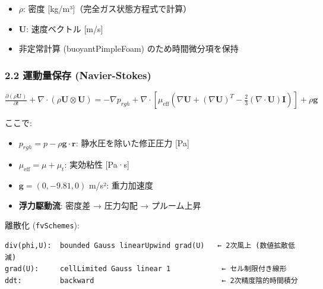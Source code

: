 \documentclass[a4paper,11pt]{article}
\begin{document}
\begin{itemize} \item $\rho$: 密度 [kg/m³]（完全ガス状態方程式で計算） \end{itemize}
\begin{itemize} \item $\mathbf{U}$: 速度ベクトル [m/s] \end{itemize}
\begin{itemize} \item 非定常計算 (buoyantPimpleFoam) のため時間微分項を保持 \end{itemize}

\subsubsection{2.2 運動量保存 (Navier-Stokes)}

$
\frac{\partial (\rho \mathbf{U})}{\partial t}
+ \nabla \cdot (\rho \mathbf{U} \otimes \mathbf{U})
= -\nabla p_{rgh}
+ \nabla \cdot \left[ \mu_{\text{eff}} \left( \nabla \mathbf{U} + (\nabla \mathbf{U})^T - \frac{2}{3} (\nabla \cdot \mathbf{U}) \mathbf{I} \right) \right]
+ \rho \mathbf{g}
$

ここで:

\begin{itemize} \item $p_{rgh} = p - \rho \mathbf{g} \cdot \mathbf{r}$: 静水圧を除いた修正圧力 [Pa] \end{itemize}
\begin{itemize} \item $\mu_{\text{eff}} = \mu + \mu_t$: 実効粘性 [Pa·s] \end{itemize}
\begin{itemize} \item $\mathbf{g} = (0, -9.81, 0)$ m/s²: 重力加速度 \end{itemize}
\begin{itemize} \item \textbf{浮力駆動流}: 密度差 → 圧力勾配 → プルーム上昇 \end{itemize}

離散化 (\texttt{fvSchemes}):

\begin{verbatim}
div(phi,U):  bounded Gauss linearUpwind grad(U)   ← 2次風上 (数値拡散低減)
grad(U):     cellLimited Gauss linear 1            ← セル制限付き線形
ddt:         backward                              ← 2次精度陰的時間積分
\end{verbatim}
\end{document}
